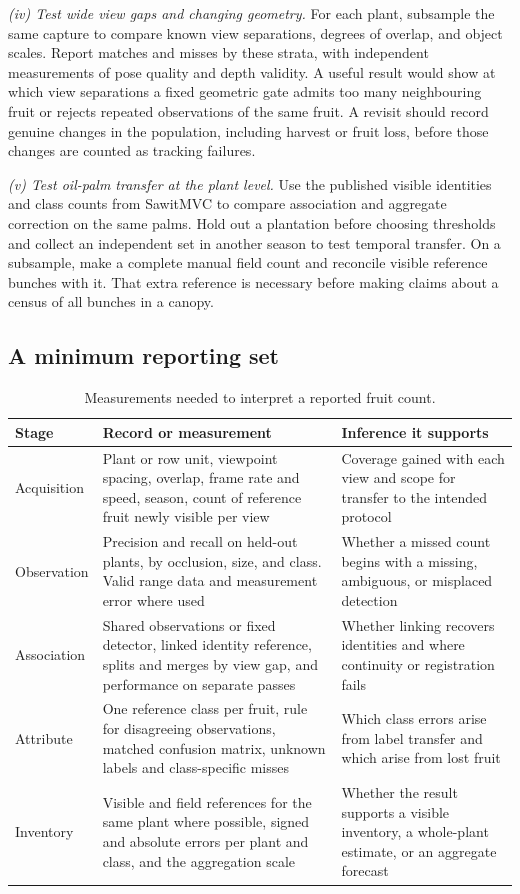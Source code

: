 \textit{(iv) Test wide view gaps and changing geometry.} For each plant, subsample the same capture to compare known view separations, degrees of overlap, and object scales. Report matches and misses by these strata, with independent measurements of pose quality and depth validity. A useful result would show at which view separations a fixed geometric gate admits too many neighbouring fruit or rejects repeated observations of the same fruit. A revisit should record genuine changes in the population, including harvest or fruit loss, before those changes are counted as tracking failures.

\textit{(v) Test oil-palm transfer at the plant level.} Use the published visible identities and class counts from SawitMVC to compare association and aggregate correction on the same palms. Hold out a plantation before choosing thresholds and collect an independent set in another season to test temporal transfer. On a subsample, make a complete manual field count and reconcile visible reference bunches with it. That extra reference is necessary before making claims about a census of all bunches in a canopy.

\subsection{A minimum reporting set}\label{sec:reporting-set}

\begin{table}[!t]
\centering
\caption{Measurements needed to interpret a reported fruit count.}\label{tab:reporting}
\small
\begin{tabularx}{\textwidth}{@{}L{2.7cm}YY@{}}
\toprule
Stage & Record or measurement & Inference it supports\\
\midrule
Acquisition & Plant or row unit, viewpoint spacing, overlap, frame rate and speed, season, count of reference fruit newly visible per view & Coverage gained with each view and scope for transfer to the intended protocol\\
Observation & Precision and recall on held-out plants, by occlusion, size, and class. Valid range data and measurement error where used & Whether a missed count begins with a missing, ambiguous, or misplaced detection\\
Association & Shared observations or fixed detector, linked identity reference, splits and merges by view gap, and performance on separate passes & Whether linking recovers identities and where continuity or registration fails\\
Attribute & One reference class per fruit, rule for disagreeing observations, matched confusion matrix, unknown labels and class-specific misses & Which class errors arise from label transfer and which arise from lost fruit\\
Inventory & Visible and field references for the same plant where possible, signed and absolute errors per plant and class, and the aggregation scale & Whether the result supports a visible inventory, a whole-plant estimate, or an aggregate forecast\\
\bottomrule
\end{tabularx}
\end{table}

